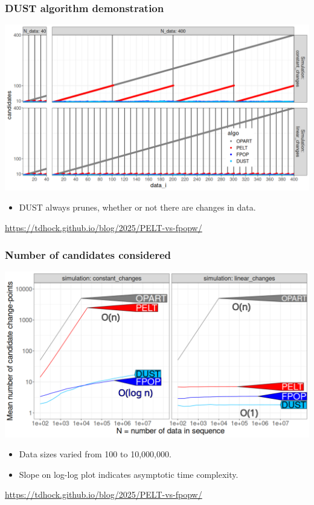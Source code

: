 \documentclass{beamer}
\begin{document}
\begin{frame}
  \frametitle{DUST algorithm demonstration}
  \includegraphics[width=\textwidth]{dust-prune-1.png}

  \begin{itemize}
  \item DUST always prunes, whether or not there are changes in data.
  \end{itemize}

  \url{https://tdhock.github.io/blog/2025/PELT-vs-fpopw/}
\end{frame}

\begin{frame}
  \frametitle{Number of candidates considered}
  \includegraphics[width=\textwidth]{figure-pred-candidates-O.png}
 
  \begin{itemize}
  \item Data sizes varied from 100 to 10,000,000.
  \item Slope on log-log plot indicates asymptotic time complexity.
  \end{itemize}

  \url{https://tdhock.github.io/blog/2025/PELT-vs-fpopw/}
\end{frame}
\end{document}
